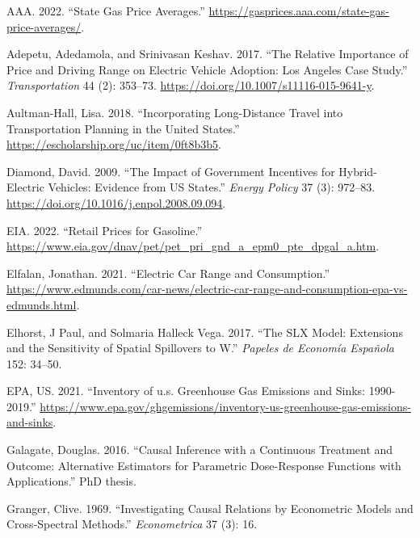 \documentclass[
  letterpaper,
  DIV=11,
  numbers=noendperiod]{scrartcl}
\newlength{\cslhangindent}
\newlength{\cslentryspacingunit} %
\newenvironment{CSLReferences}[2] %
 {%
  \setlength{\parindent}{0pt}
  \ifodd #1
  \let\oldpar\par
  \def\par{\hangindent=\cslhangindent\oldpar}
  \fi
  \setlength{\parskip}{#2\cslentryspacingunit}
 }%
 {}
\begin{document}
\hypertarget{refs}{}
\begin{CSLReferences}{1}{0}
\leavevmode{}%
AAA. 2022. {``State Gas Price Averages.''}
\url{https://gasprices.aaa.com/state-gas-price-averages/}.

\leavevmode{}%
Adepetu, Adedamola, and Srinivasan Keshav. 2017. {``The Relative
Importance of Price and Driving Range on Electric Vehicle Adoption: Los
Angeles Case Study.''} \emph{Transportation} 44 (2): 353--73.
\url{https://doi.org/10.1007/s11116-015-9641-y}.

\leavevmode{}%
Aultman-Hall, Lisa. 2018. {``Incorporating Long-Distance Travel into
Transportation Planning in the United States.''}
\url{https://escholarship.org/uc/item/0ft8b3b5}.

\leavevmode{}%
Diamond, David. 2009. {``The Impact of Government Incentives for
Hybrid-Electric Vehicles: Evidence from US States.''} \emph{Energy
Policy} 37 (3): 972--83.
\url{https://doi.org/10.1016/j.enpol.2008.09.094}.

\leavevmode{}%
EIA. 2022. {``Retail Prices for Gasoline.''}
\url{https://www.eia.gov/dnav/pet/pet_pri_gnd_a_epm0_pte_dpgal_a.htm}.

\leavevmode{}%
Elfalan, Jonathan. 2021. {``Electric Car Range and Consumption.''}
\url{https://www.edmunds.com/car-news/electric-car-range-and-consumption-epa-vs-edmunds.html}.

\leavevmode{}%
Elhorst, J Paul, and Solmaria Halleck Vega. 2017. {``The SLX Model:
Extensions and the Sensitivity of Spatial Spillovers to W.''}
\emph{Papeles de Economía Española} 152: 34--50.

\leavevmode{}%
EPA, US. 2021. {``Inventory of u.s. Greenhouse Gas Emissions and Sinks:
1990-2019.''}
\url{https://www.epa.gov/ghgemissions/inventory-us-greenhouse-gas-emissions-and-sinks}.

\leavevmode{}%
Galagate, Douglas. 2016. {``Causal Inference with a Continuous Treatment
and Outcome: Alternative Estimators for Parametric Dose-Response
Functions with Applications.''} PhD thesis.

\leavevmode{}%
Granger, Clive. 1969. {``Investigating Causal Relations by Econometric
Models and Cross-Spectral Methods.''} \emph{Econometrica} 37 (3): 16.


\end{CSLReferences}
\end{document}
